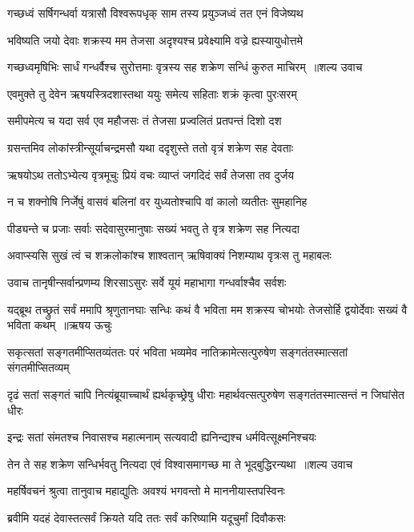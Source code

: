 \twolineshloka
{गच्छध्वं सर्षिगन्धर्वा यत्रासौ विश्वरूपधृक्}
{साम तस्य प्रयुञ्जध्वं तत एनं विजेष्यथ}


\twolineshloka
{भविष्यति जयो देवाः शक्रस्य मम तेजसा}
{अदृश्यश्च प्रवेक्ष्यामि वज्रे ह्यस्यायुधोत्तमे}


\threelineshloka
{गच्छध्वमृषिभिः सार्धं गन्धर्वैश्च सुरोत्तमाः}
{वृत्रस्य सह शक्रेण सन्धिं कुरुत माचिरम् ॥शल्य उवाच}
{}


\twolineshloka
{एवमुक्ते तु देवेन ऋषयस्त्रिदशास्तथा}
{ययुः समेत्य सहिताः शक्रं कृत्वा पुरःसरम्}


\twolineshloka
{समीपमेत्य च यदा सर्व एव महौजसः}
{तं तेजसा प्रज्वलितं प्रतपन्तं दिशो दश}


\twolineshloka
{ग्रसन्तमिव लोकांस्त्रीन्सूर्याचन्द्रमसौ यथा}
{ददृशुस्ते ततो वृत्रं शक्रेण सह देवताः}


\twolineshloka
{ऋषयोऽथ ततोऽभ्येत्य वृत्रमूचुः प्रियं वचः}
{व्याप्तं जगदिदं सर्वं तेजसा तव दुर्जय}


\twolineshloka
{न च शक्नोषि निर्जेषुं वासवं बलिनां वर}
{युध्यतोश्चापि वां कालो व्यतीतः सुमहानिह}


\twolineshloka
{पीड्यन्ते च प्रजाः सर्वाः सदेवासुरमानुषाः}
{सख्यं भवतु ते वृत्र शक्रेण सह नित्यदा}


\twolineshloka
{अवाप्स्यसि सुखं त्वं च शक्रलोकांश्च शाश्वतान्}
{ऋषिवाक्यं निशम्याथ वृत्रःस तु महाबलः}


\twolineshloka
{उवाच तानृषीन्सर्वान्प्रणम्य शिरसाऽसुरः}
{सर्वे यूयं महाभागा गन्धर्वाश्चैव सर्वशः}


\fourlineindentedshloka
{यद्ब्रूथ तच्छ्रुतं सर्वं ममापि श्रृणुतानघाः}
{सन्धिः कथं वै भविता मम शक्रस्य चोभयोः}
{तेजसोर्हि द्वयोर्देवाः सख्यं वै भविता कथम् ॥ऋषय ऊचुः}
{}


\twolineshloka
{सकृत्सतां सङ्गतमीप्सितव्यंततः परं भविता भव्यमेव}
{नातिक्रामेत्सत्पुरुषेण सङ्गतंतस्मात्सतां संगतमीप्सितव्यम्}


\twolineshloka
{दृढं सतां सङ्गतं चापि नित्यंब्रूयाच्चार्थं ह्यर्थकृच्छ्रेषु धीराः}
{महार्थवत्सत्पुरुषेण सङ्गतंतस्मात्सन्तं न जिघांसेत धीरः}


\twolineshloka
{इन्द्रः सतां संमतश्च निवासश्च महात्मनाम्}
{सत्यवादी ह्यनिन्द्यश्च धर्मवित्सूक्ष्मनिश्चयः}


\threelineshloka
{तेन ते सह शक्रेण सन्धिर्भवतु नित्यदा}
{एवं विश्वासमागच्छ मा ते भूद्बुद्धिरन्यथा ॥शल्य उवाच}
{}


\twolineshloka
{महर्षिवचनं श्रुत्वा तानुवाच महाद्युतिः}
{अवश्यं भगवन्तो मे माननीयास्तपस्विनः}


\twolineshloka
{ब्रवीमि यदहं देवास्तत्सर्वं क्रियते यदि}
{ततः सर्वं करिष्यामि यदूचुर्मां दिवौकसः}


